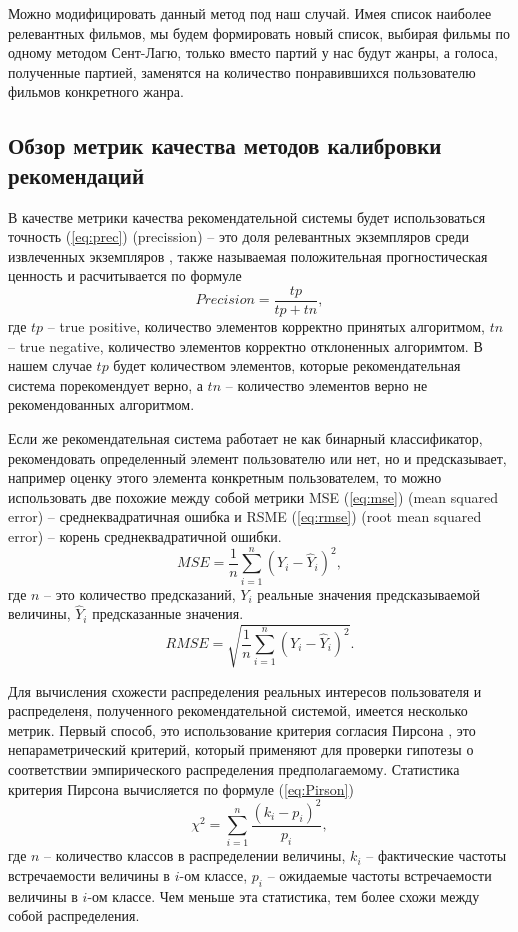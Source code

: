 Можно модифицировать данный метод под наш случай. 
Имея список наиболее релевантных фильмов, мы будем 
формировать новый список, выбирая фильмы по одному 
методом Сент-Лагю, только вместо партий у нас будут 
жанры, а голоса, полученные партией, заменятся на количество 
понравившихся пользователю фильмов конкретного жанра.

\subsection{Обзор метрик качества методов калибровки рекомендаций}
В качестве метрики качества рекомендательной системы будет 
использоваться точность (\ref{eq:prec}) (precission) --  это доля релевантных экземпляров 
среди извлеченных экземпляров \cite{bib6}, также называемая положительная 
прогностическая ценность и расчитывается по формуле \begin{equation}
    Precision = \frac{tp}{tp+tn},
    \label{eq:prec}
  \end{equation}
  где ${tp}$ -- true positive, количество элементов корректно принятых алгоритмом, 
  ${tn}$ -- true negative, количество элементов корректно отклоненных алгоримтом. 
  В нашем случае ${tp}$ будет количеством элементов, которые рекомендательная система 
  порекомендует верно, а ${tn}$ -- количество элементов верно не рекомендованных алгоритмом.

Если же рекомендательная система работает не как бинарный классификатор, рекомендовать
определенный элемент пользователю или нет, но и предсказывает, например оценку этого
элемента конкретным пользователем, то можно использовать две похожие между собой метрики
MSE (\ref{eq:mse}) (mean squared error) -- среднеквадратичная ошибка и RSME (\ref{eq:rmse}) 
(root mean squared error) -- корень среднеквадратичной ошибки.
\begin{equation}
    MSE = \frac{1}{n}\sum_{i=1}^n(Y_i-\hat Y_i)^2,
    \label{eq:mse}
  \end{equation}
  где ${n}$ -- это количество предсказаний,  ${Y_i}$ реальные значения 
  предсказываемой величины, ${\hat Y_i}$ предсказанные значения.
  \begin{equation}
    RMSE = \sqrt{\frac{1}{n}\sum_{i=1}^n(Y_i-\hat Y_i)^2}.
    \label{eq:rmse}
  \end{equation}

  Для вычисления схожести распределения реальных интересов пользователя и распределеня, 
  полученного рекомендательной системой, имеется несколько метрик. Первый способ, это
  использование критерия согласия Пирсона \cite{bib7}, это непараметрический критерий,
  который применяют для проверки гипотезы о соответствии эмпирического распределения предполагаемому.
  Статистика критерия Пирсона вычисляется по формуле (\ref{eq:Pirson})
  \begin{equation}
    \chi^2 = \sum_{i=1}^n\frac{(k_i-p_i)^2}{p_i},
    \label{eq:Pirson}
  \end{equation}
  где ${n}$ -- количество
  классов в распределении величины, ${k_i}$ -- фактические частоты встречаемости величины в ${i}$-ом классе,
  ${p_i}$ -- ожидаемые частоты встречаемости величины в ${i}$-ом классе. Чем меньше эта статистика, тем более схожи между собой распределения.

